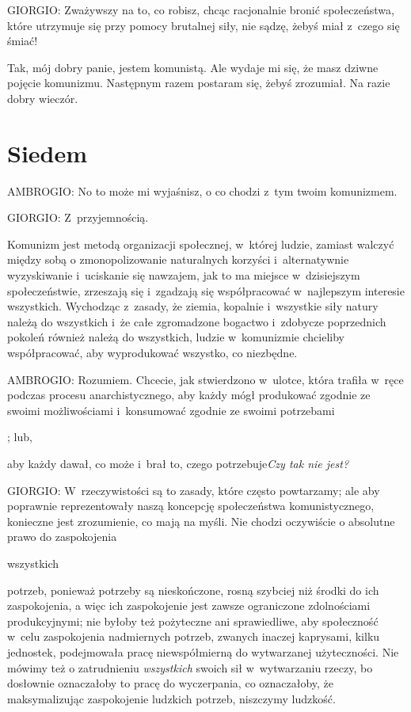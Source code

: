 \documentclass[oneside,polish,11pt,sfheadings]{mwbk}
\begin{document}
 
\noindent GIORGIO: Zważywszy na to, co robisz, chcąc racjonalnie bronić społeczeństwa, które utrzymuje się przy pomocy brutalnej
siły, nie sądzę, żebyś miał z~czego się śmiać! 

 
Tak, mój dobry panie, jestem komunistą. Ale wydaje mi się, że masz dziwne pojęcie komunizmu. Następnym razem postaram
się, żebyś zrozumiał. Na razie dobry wieczór. 










\chapter*{Siedem}



 
\noindent AMBROGIO: No to może mi wyjaśnisz, o co chodzi z~tym twoim komunizmem. 




 
\noindent GIORGIO: Z~przyjemnością. 

 
Komunizm jest metodą organizacji społecznej, w~której ludzie, zamiast walczyć między sobą o zmonopolizowanie naturalnych
korzyści i~alternatywnie wyzyskiwanie i~uciskanie się nawzajem, jak to ma miejsce w~dzisiejszym społeczeństwie,
zrzeszają się i~zgadzają się współpracować w~najlepszym interesie wszystkich. Wychodząc z~zasady, że ziemia, kopalnie i~wszystkie siły natury należą do wszystkich i~że całe zgromadzone bogactwo i~zdobycze poprzednich pokoleń również należą
do wszystkich, ludzie w~komunizmie chcieliby współpracować, aby wyprodukować wszystko, co niezbędne. 




\noindent AMBROGIO: Rozumiem. Chcecie, jak stwierdzono w~ulotce, która trafiła w~ręce podczas procesu anarchistycznego, aby każdy
mógł produkować zgodnie ze swoimi możliwościami i~konsumować zgodnie ze swoimi potrzebami\begin{itshape};
lub,\end{itshape}aby każdy dawał, co może i~brał to, czego potrzebuje\textit{Czy tak nie
jest?}




 
\noindent GIORGIO: W~rzeczywistości są to zasady, które często powtarzamy; ale aby poprawnie reprezentowały naszą koncepcję
społeczeństwa komunistycznego, konieczne jest zrozumienie, co mają na myśli. Nie chodzi oczywiście o absolutne prawo do
zaspokojenia \begin{itshape}wszystkich \end{itshape} potrzeb, ponieważ potrzeby są
nieskończone, rosną szybciej niż środki do ich zaspokojenia, a więc ich zaspokojenie jest zawsze ograniczone
zdolnościami produkcyjnymi; nie byłoby też pożyteczne ani sprawiedliwe, aby społeczność w~celu zaspokojenia nadmiernych
potrzeb, zwanych inaczej kaprysami, kilku jednostek, podejmowała pracę niewspółmierną do wytwarzanej użyteczności. Nie
mówimy też o zatrudnieniu \textit{wszystkich } swoich sił w~wytwarzaniu rzeczy, bo dosłownie oznaczałoby to
pracę do wyczerpania, co oznaczałoby, że maksymalizując zaspokojenie ludzkich potrzeb, niszczymy ludzkość. 
\end{document}
